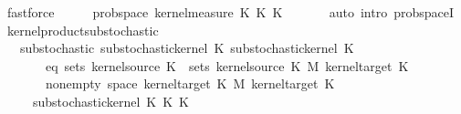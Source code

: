 \begin{isabellebody}
\ fastforce\isanewline
\ \ \isamarkupfalse%
\ \isamarkupfalse%
\ {\isachardoublequoteopen}prob{\isacharunderscore}{\kern0pt}space\ {\isacharparenleft}{\kern0pt}kernel{\isacharunderscore}{\kern0pt}measure\ {\isacharparenleft}{\kern0pt}K{\isacharunderscore}{\kern0pt}{}\ {\isasymOtimes}\isactrlsub K\ K{\isacharunderscore}{\kern0pt}{}{\isacharparenright}{\kern0pt}\ {\isasymomega}{\isacharparenright}{\kern0pt}{\isachardoublequoteclose}\isanewline
\ \ \ \ \isamarkupfalse%
\ {\isacharparenleft}{\kern0pt}auto\ intro{\isacharcolon}{\kern0pt}\ prob{\isacharunderscore}{\kern0pt}spaceI{\isacharparenright}{\kern0pt}\isanewline
{}\isamarkupfalse%
%
\endisatagproof
{\isafoldproof}%
%
\isadelimproof
\isanewline
%
\endisadelimproof
\isanewline
\isanewline
{}\isamarkupfalse%
\ kernel{\isacharunderscore}{\kern0pt}product{\isacharunderscore}{\kern0pt}substochastic{\isacharcolon}{\kern0pt}\ \ \ \ \isanewline
\ \ \ substochastic{\isacharcolon}{\kern0pt}\ {\isachardoublequoteopen}substochastic{\isacharunderscore}{\kern0pt}kernel\ K{\isacharunderscore}{\kern0pt}{}{\isachardoublequoteclose}\ {\isachardoublequoteopen}substochastic{\isacharunderscore}{\kern0pt}kernel\ K{\isacharunderscore}{\kern0pt}{}{\isachardoublequoteclose}\isanewline
\ \ \ \ \ \ \ eq{\isacharcolon}{\kern0pt}\ {\isachardoublequoteopen}sets\ {\isacharparenleft}{\kern0pt}kernel{\isacharunderscore}{\kern0pt}source\ K{\isacharunderscore}{\kern0pt}{}{\isacharparenright}{\kern0pt}\ {\isacharequal}{\kern0pt}\ sets\ {\isacharparenleft}{\kern0pt}kernel{\isacharunderscore}{\kern0pt}source\ K{\isacharunderscore}{\kern0pt}{}\ {\isasymOtimes}\isactrlsub M\ kernel{\isacharunderscore}{\kern0pt}target\ K{\isacharunderscore}{\kern0pt}{}{\isacharparenright}{\kern0pt}{\isachardoublequoteclose}\isanewline
\ \ \ \ \ \ \ nonempty{\isacharcolon}{\kern0pt}\ {\isachardoublequoteopen}space\ {\isacharparenleft}{\kern0pt}kernel{\isacharunderscore}{\kern0pt}target\ K{\isacharunderscore}{\kern0pt}{}\ {\isasymOtimes}\isactrlsub M\ kernel{\isacharunderscore}{\kern0pt}target\ K{\isacharunderscore}{\kern0pt}{}{\isacharparenright}{\kern0pt}\ {\isasymnoteq}\ {\isacharbraceleft}{\kern0pt}{\isacharbraceright}{\kern0pt}{\isachardoublequoteclose}\ \isanewline
\ \ \ \ \ \ \ \ \isanewline
\ \ \ \ \ {\isachardoublequoteopen}substochastic{\isacharunderscore}{\kern0pt}kernel\ {\isacharparenleft}{\kern0pt}K{\isacharunderscore}{\kern0pt}{}\ {\isasymOtimes}\isactrlsub K\ K{\isacharunderscore}{\kern0pt}{}{\isacharparenright}{\kern0pt}{\isachardoublequoteclose}\isanewline

\end{isabellebody}
